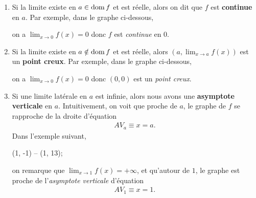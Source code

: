 \documentclass[main.tex]{subfiles}
\begin{document}
\begin{enumerate}
    \item Si la limite existe en $a \in \operatorname{dom} f$ et est réelle,
        alors on dit que $f$ est \textbf{continue} en $a$.
        Par exemple,
        dans le graphe ci-dessous,
        \begin{center}
            \begin{plot}{0.5}{-6}{-2}{6}{2}
            \end{plot}
        \end{center}
        on a $\lim_{x \to 0} f(x) = 0$ donc $f$ est \emph{continue} en $0$.
    \item Si la limite existe en $a \notin \operatorname{dom} f$ et est réelle,
        alors $(a, \lim_{x \to a} f(x))$ est un \textbf{point creux}.
        Par exemple,
        dans le graphe ci-dessous,
        \begin{center}
            \begin{plot}{0.5}{-6}{-2}{6}{2}
            \end{plot}
        \end{center}
        on a $\lim_{x \to 0} f(x) = 0$ donc $(0, 0)$ est un \emph{point creux}.
    \item Si une limite latérale en $a$ est infinie,
        alors nous avons une \textbf{asymptote verticale} en $a$.
        Intuitivement,
        on voit que proche de $a$,
        le graphe de $f$ se rapproche de la droite d'équation
        \begin{align}
            AV_a \equiv x = a.
        \end{align}
        Dans l'exemple suivant,
        \begin{center}
            \begin{plot}{0.25}{-6}{-1}{6}{12}
                \drawline (1, -1) -- (1, 13);
            \end{plot}
        \end{center}
        on remarque que $\lim_{x \to 1} f(x) = +\infty$,
        et qu'autour de $1$,
        le graphe est proche de l'\emph{asymptote verticale} d'équation
        \begin{align}
            AV_1 \equiv x = 1.
        \end{align}
\end{enumerate}
\end{document}
